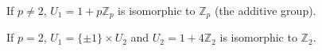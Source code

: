 If $p \neq 2$, $U_1 = 1 + p\mathbb{Z}_p$ is isomorphic to $\mathbb{Z}_p$ (the additive group).

If $p = 2$, $U_1 = \{\pm 1\} \times U_2$ and $U_2 = 1 + 4\mathbb{Z}_2$ is isomorphic to $\mathbb{Z}_2$.
